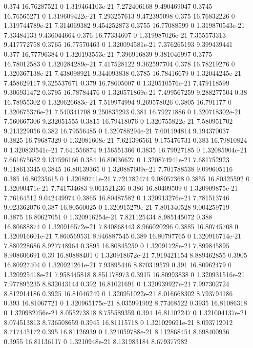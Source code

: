 {0.374 16.76287521 0 1.319464103e-21 7.272406168 9.490469047
0.3745 16.76565271 0 1.319609422e-21 7.293257613 9.472395098
0.375 16.76832226 0 1.319744789e-21 7.314069382 9.454252873
0.3755 16.77088599 0 1.319870543e-21 7.33484133 9.436044664
0.376 16.77334607 0 1.319987026e-21 7.355573313 9.417772758
0.3765 16.77570463 0 1.320094581e-21 7.376265193 9.399439441
0.377 16.77796384 0 1.320193553e-21 7.396916839 9.381046997
0.3775 16.78012583 0 1.320284289e-21 7.417528122 9.362597704
0.378 16.78219276 0 1.320367138e-21 7.438098921 9.344093838
0.3785 16.78416679 0 1.32044245e-21 7.458629117 9.325537671
0.379 16.78605007 0 1.320510576e-21 7.479118599 9.306931472
0.3795 16.78784476 0 1.320571869e-21 7.499567259 9.288277504
0.38 16.78955302 0 1.320626683e-21 7.519974994 9.269578026
0.3805 16.791177 0 1.320675376e-21 7.540341708 9.250835293
0.381 16.79271886 0 1.320718302e-21 7.560667306 9.232051555
0.3815 16.79418076 0 1.320755822e-21 7.580951702 9.213229056
0.382 16.79556485 0 1.320788294e-21 7.601194814 9.194370037
0.3825 16.79687329 0 1.32081608e-21 7.621396561 9.175476731
0.383 16.79810824 0 1.320839541e-21 7.641556874 9.156551366
0.3835 16.79927185 0 1.32085904e-21 7.661675682 9.137596166
0.384 16.80036627 0 1.320874941e-21 7.681752923 9.118613345
0.3845 16.80139365 0 1.320887609e-21 7.701788538 9.099605116
0.385 16.80235615 0 1.32089741e-21 7.721782474 9.08057368
0.3855 16.80325592 0 1.32090471e-21 7.741734683 9.061521236
0.386 16.80409509 0 1.320909875e-21 7.76164512 9.042449974
0.3865 16.80487582 0 1.320913276e-21 7.781513746 9.023362076
0.387 16.80560025 0 1.320915279e-21 7.801340528 9.004259719
0.3875 16.80627051 0 1.320916254e-21 7.821125434 8.985145072
0.388 16.80688874 0 1.320916572e-21 7.840868443 8.966020296
0.3885 16.80745708 0 1.320916601e-21 7.860569531 8.946887545
0.389 16.80797765 0 1.320916714e-21 7.880228686 8.927748964
0.3895 16.80845259 0 1.32091728e-21 7.899845895 8.908606691
0.39 16.80888401 0 1.320918672e-21 7.919421154 8.889462855
0.3905 16.80927404 0 1.320921261e-21 7.93895446 8.870319579
0.391 16.80962479 0 1.320925418e-21 7.958445818 8.851178973
0.3915 16.80993838 0 1.320931516e-21 7.977895235 8.832043144
0.392 16.81021691 0 1.320939927e-21 7.997302724 8.812914186
0.3925 16.81046249 0 1.320951022e-21 8.016668302 8.793794186
0.393 16.81067721 0 1.320965175e-21 8.035991992 8.77468522
0.3935 16.81086318 0 1.320982756e-21 8.055273818 8.755589359
0.394 16.81102247 0 1.321004137e-21 8.074513813 8.736508659
0.3945 16.81115718 0 1.321029691e-21 8.093712012 8.717445172
0.395 16.81126939 0 1.321059788e-21 8.112868454 8.698400936
0.3955 16.81136117 0 1.3210948e-21 8.131983184 8.679377982
}
